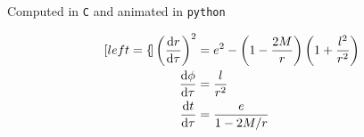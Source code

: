 Computed in \texttt{C} and animated in \texttt{python}

\begin{subequations}
\label{cap2:eq:orbits}
    \begin{align}[left = {\empheqlbrace}]
        \left(\dv{r}{\tau}\right)^2 &= e^2 - \left(1 - \frac{2M}{r}\right)
        \left(1 + \frac{l^2}{r^2}\right) \label{cap2:eq:r_of_tau} \\
        \dv{\phi}{\tau} &= \frac{l}{r^2} \label{cap2:eq:phi_of_tau}\\
        \dv{t}{\tau} &= \frac{e}{1 - 2 M / r} \label{cap2:eq:t_of_tau}
    \end{align}
\end{subequations}

